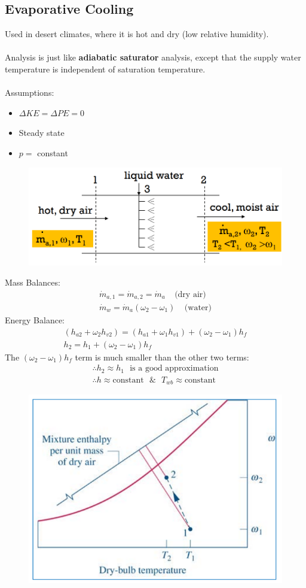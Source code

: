 \documentclass[class=report, crop=false, 12pt,a4paper]{standalone}
\numberwithin{equation}{section}
\begin{document}
\subsection{Evaporative Cooling}
Used in desert climates, where it is hot and dry (low relative humidity). \\\\
Analysis is just like \textbf{adiabatic saturator} analysis, except that the supply water temperature is independent of saturation temperature. \\\\
Assumptions:
\begin{itemize}[noitemsep]
  \item $\Delta KE = \Delta PE = 0$
  \item Steady state
  \item $p =$ constant
\end{itemize}
\begin{figure}[H]
  \centering
  \includegraphics[width = 0.75 \textwidth]{../img/diagram121.png}
  \caption{}
\end{figure}
Mass Balances:
\begin{gather}
  \dot{m}_{a,1} = \dot{m}_{a,2} = \dot{m}_{a} \ \ \ \ \ \text{(dry air)} \\[5pt]
  \dot{m}_{w} = \dot{m}_{a}(\omega_2-\omega_1) \ \ \ \ \ \text{(water)}
\end{gather}
Energy Balance:
\begin{gather}
  (h_{a2} + \omega_2h_{v2}) = (h_{a1} + \omega_1h_{v1}) + (\omega_2-\omega_1)h_{f} \\[5pt]
  h_2 = h_1 + (\omega_2-\omega_1)h_f
\end{gather}
The $(\omega_2-\omega_1)h_f$ term is much smaller than the other two terms:
\begin{gather}
  \therefore h_2 \approx h_1 \ \ \ \text{is a good approximation} \\[5pt]
  \therefore h \approx \text{constant} \ \ \ \& \ \ \ T_{wb} \approx \text{constant}
\end{gather}
\begin{figure}[H]
  \centering
  \includegraphics[width = 0.7 \textwidth]{../img/diagram122.png}
  \caption{}
\end{figure}
\end{document}

